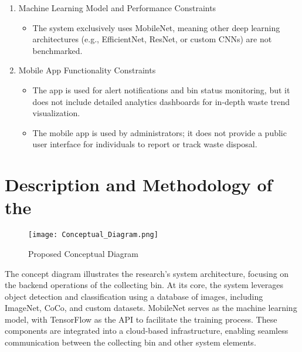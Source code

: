\begin{enumerate}
	\item Machine Learning Model and Performance Constraints
		\begin{itemize}
			\item The system exclusively uses MobileNet, meaning other deep learning architectures (e.g., EfficientNet, ResNet, or custom CNNs) are not benchmarked.
		\end{itemize}

	\item Mobile App Functionality Constraints
		\begin{itemize}
			\item The app is used for alert notifications and bin status monitoring, but it does not include detailed analytics dashboards for in-depth waste trend visualization.
			\item The mobile app is used by administrators; it does not provide a public user interface for individuals to report or track waste disposal.
		\end{itemize}
		


\end{enumerate}

\section{Description and Methodology of the \documentType}


\begin{figure}[!htbp]
	\centering
		\texttt{[image: Conceptual\_Diagram.png]}
	\caption{Proposed Conceptual Diagram}
	\label{fig:Description and Methodology}
\end{figure}

The concept diagram illustrates the research's system architecture, focusing on the backend operations of the collecting bin. At its core, the system leverages object detection and classification using a database of images, including ImageNet, CoCo, and custom datasets. MobileNet serves as the machine learning model, with TensorFlow as the API to facilitate the training process. These components are integrated into a cloud-based infrastructure, enabling seamless communication between the collecting bin and other system elements. 

